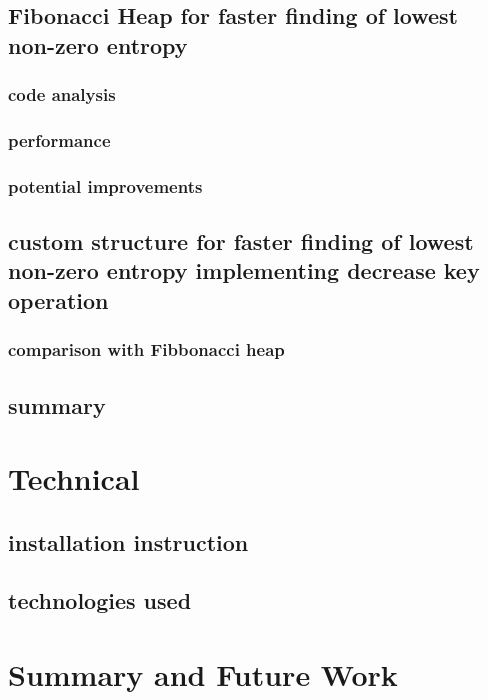\documentclass[shortabstract, english, inz]{iithesis}
\begin{document}
    \section{Fibonacci Heap for faster finding of lowest non-zero entropy}
        \subsection{code analysis}
        \subsection{performance}
        \subsection{potential improvements}
    \section{custom structure for faster finding of lowest non-zero entropy implementing decrease key operation}
        \subsection{comparison with Fibbonacci heap}
    \section{summary}
\chapter{Technical}
\label{chapter5}
    \section{installation instruction}
    \section{technologies used}
\chapter{Summary and Future Work}
\label{chapter6}


\printbibliography[sorting=none]
\end{document}
